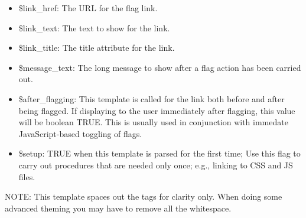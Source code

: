 \begin{itemize}
\item \$link\_\-href: The URL for the flag link.\item \$link\_\-text: The text to show for the link.\item \$link\_\-title: The title attribute for the link.\end{itemize}


\begin{itemize}
\item \$message\_\-text: The long message to show after a flag action has been carried out.\item \$after\_\-flagging: This template is called for the link both before and after being flagged. If displaying to the user immediately after flagging, this value will be boolean TRUE. This is usually used in conjunction with immedate JavaScript-based toggling of flags.\item \$setup: TRUE when this template is parsed for the first time; Use this flag to carry out procedures that are needed only once; e.g., linking to CSS and JS files.\end{itemize}


NOTE: This template spaces out the  tags for clarity only. When doing some advanced theming you may have to remove all the whitespace. 